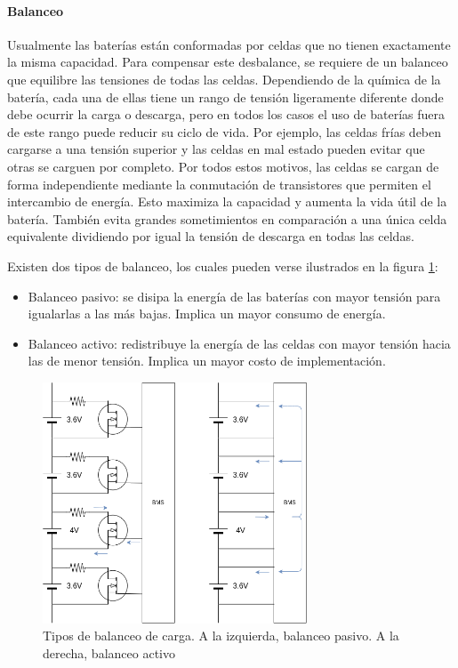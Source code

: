\paragraph{Balanceo}
Usualmente las baterías están conformadas por celdas que no tienen exactamente la misma capacidad. 
Para compensar este desbalance, se requiere de un balanceo que equilibre las tensiones de todas las celdas. 
Dependiendo de la química de la batería, cada una de ellas tiene un rango de tensión ligeramente diferente donde debe ocurrir la carga o descarga, pero en todos los casos el uso de baterías fuera de este rango puede reducir su ciclo de vida. 
Por ejemplo, las celdas frías deben cargarse a una tensión superior y las celdas en mal estado pueden evitar que otras se carguen por completo. 
Por todos estos motivos, las celdas se cargan de forma independiente mediante la conmutación de transistores que permiten el intercambio de energía. Esto maximiza la capacidad y aumenta la vida útil de la batería. También evita grandes sometimientos en comparación a una única celda equivalente dividiendo por igual la tensión de descarga en todas las celdas.

Existen dos tipos de balanceo, los cuales pueden verse ilustrados en la figura \ref{fig:bms-load-balancing}:

\begin{itemize}
    \item Balanceo pasivo: se disipa la energía de las baterías con mayor tensión para igualarlas a las más bajas. Implica un mayor consumo de energía.
    \item Balanceo activo: redistribuye la energía de las celdas con mayor tensión hacia las de menor tensión. Implica un mayor costo de implementación.
\end{itemize}

\begin{figure}[H]
    \centering
    \includegraphics[width=0.7\textwidth]{images/bms-load-balancing.png}
    \caption{Tipos de balanceo de carga. A la izquierda, balanceo pasivo. A la derecha, balanceo activo}
    \label{fig:bms-load-balancing}
\end{figure}

